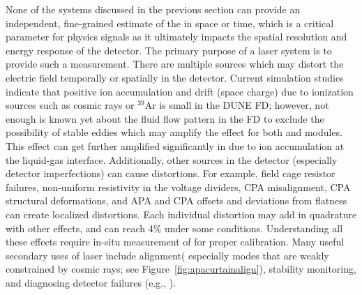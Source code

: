  None of the systems discussed in the previous section can  provide an independent, fine-grained estimate of the \efield in space or time, which is a critical parameter for physics signals as it ultimately impacts the spatial resolution and energy response of the detector. The primary purpose of a laser system is to provide such a measurement. There are multiple sources which may distort the electric field temporally  or spatially in the detector. Current simulation studies indicate that positive ion accumulation and drift (space charge) due to ionization sources such as cosmic rays or ${}^{39}$Ar is small in the DUNE FD;  however, not enough is known yet about the fluid flow pattern in the FD to exclude the possibility of stable eddies which may amplify the effect for both  and  modules. This effect can get further amplified significantly in  due to ion accumulation at the liquid-gas interface. 
Additionally, other sources in the detector (especially detector imperfections) can cause \efield distortions. For example, field cage resistor failures, non-uniform resistivity in the voltage dividers, CPA misalignment, CPA structural deformations, and APA and CPA offsets and  deviations from flatness can create localized \efield distortions. Each individual \efield distortion may add in quadrature with other effects, and can reach 4\% under some conditions. Understanding all these effects require in-situ measurement of \efield for proper calibration. 
Many useful secondary uses of laser include alignment( especially modes that are weakly constrained by cosmic rays; see Figure~\ref{fig:apacurtainalign}), stability monitoring, and diagnosing detector failures (e.g., ).  

